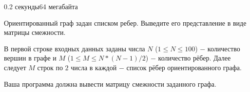 \begin{problem}{}{}{}{0.2 секунды}{64 мегабайта}

Ориентированный граф задан списком ребер. Выведите его представление в виде матрицы смежности.

\InputFile
В первой строке входных данных заданы числа $N$ ($1 \le N \le 100$) $-$ количество вершин в графе и 
$M$ ($1 \le M \le N*(N-1)/2$) $-$ количество рёбер.
Далее следует $M$ строк по $2$ числа в каждой $-$ список рёбер ориентированного графа. 

\OutputFile
Ваша программа должна вывести матрицу смежности заданного графа.

\Example

\begin{example}
%
\end{example}

\end{problem}


